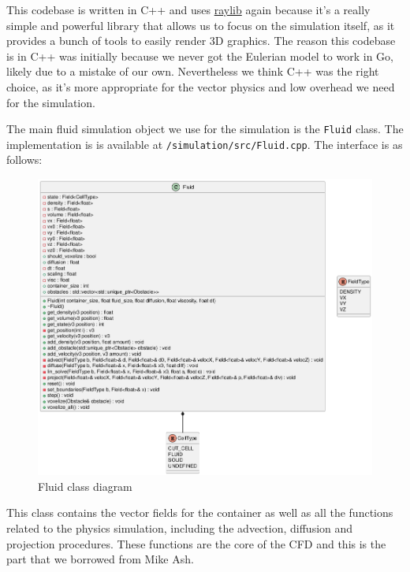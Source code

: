 \documentclass[a4paper,12pt]{article}
\begin{document}
This codebase is written in C++ and uses \href{https://www.raylib.com/}{raylib} again
because it's a really simple and powerful library that allows us to focus on the
simulation itself, as it provides a bunch of tools to easily render 3D graphics.
The reason this codebase is in C++ was initially because we never got the Eulerian
model to work in Go, likely due to a mistake of our own. Nevertheless we think C++
was the right choice, as it's more appropriate for the vector physics and low overhead
we need for the simulation.

The main fluid simulation object we use for the simulation is the \lstinline{Fluid} class.
The implementation is is available at \lstinline{/simulation/src/Fluid.cpp}.
The interface is as follows:

\begin{figure}[H]
	\centering
	\includegraphics[width=\textwidth]{resources/Fluid.png}
	\caption{Fluid class diagram}
\end{figure}

This class contains the vector fields for the container as well as all the
functions related to the physics simulation, including the advection, diffusion
and projection procedures. These functions are the core of the CFD and
this is the part that we borrowed from Mike Ash.
\end{document}
